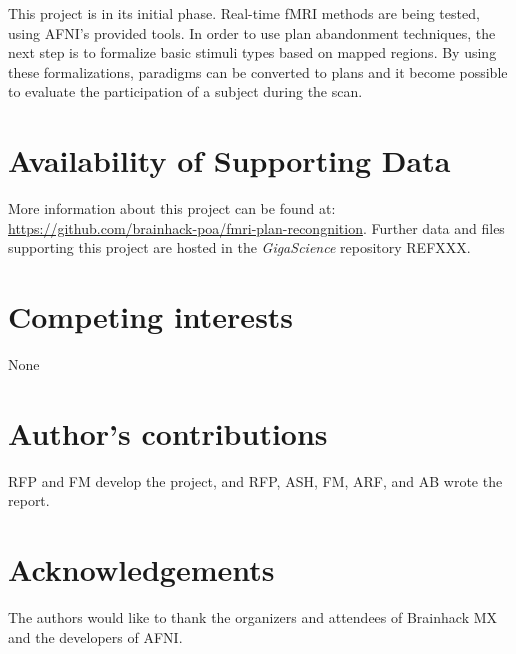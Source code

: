 \documentclass[twocolumn]{bmcart}%
\begin{document}
This project is in its initial phase. Real-time fMRI methods are being
tested, using AFNI's provided tools. In order to use plan abandonment
techniques, the next step is to formalize basic stimuli types based on
mapped regions. By using these formalizations, paradigms can be
converted to plans and it become possible to evaluate the participation
of a subject during the scan.


\begin{backmatter}

\section*{Availability of Supporting Data}
More information about this project can be found at: \url{https://github.com/brainhack-poa/fmri-plan-recongnition}. Further data and files supporting this project are hosted in the \emph{GigaScience} repository REFXXX.

\section*{Competing interests}
None

\section*{Author's contributions}
RFP and FM develop the project, and RFP, ASH, FM, ARF, and AB wrote the
report.

\section*{Acknowledgements}
The authors would like to thank the organizers and attendees of
Brainhack MX and the developers of AFNI.

  
  


\end{backmatter}
\end{document}
